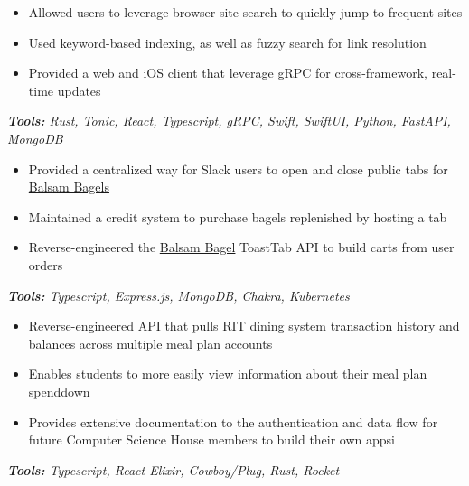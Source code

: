 \begin{itemize}
\item Allowed users to leverage browser site search to quickly jump to frequent sites
\item Used keyword-based indexing, as well as fuzzy search for link resolution
\item Provided a web and iOS client that leverage gRPC for cross-framework, real-time updates
\end{itemize}
\textit{\textbf{Tools:} Rust, Tonic, React, Typescript, gRPC, Swift, SwiftUI, Python, FastAPI, MongoDB}

\divider

\begin{itemize}
\item Provided a centralized way for Slack users to open and close public tabs for \href{https://www.balsambagels.com}{Balsam Bagels}
\item Maintained a credit system to purchase bagels replenished by hosting a tab
\item Reverse-engineered the \href{https://www.balsambagels.com}{Balsam Bagel} ToastTab API to build carts from user orders
\end{itemize}
\textit{\textbf{Tools:} Typescript, Express.js, MongoDB, Chakra, Kubernetes}

\divider

\begin{itemize}
\item Reverse-engineered API that pulls RIT dining system transaction history and balances across multiple meal plan accounts
\item Enables students to more easily view information about their meal plan spenddown
\item Provides extensive documentation to the authentication and data flow for future Computer Science House members to build their own appsi
\end{itemize}
\textit{\textbf{Tools:} Typescript, React Elixir, Cowboy/Plug, Rust, Rocket}